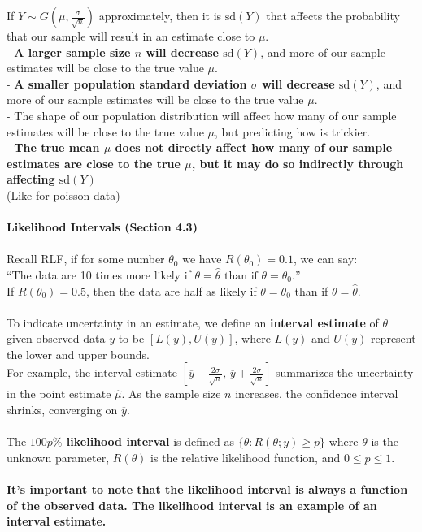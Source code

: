 \documentclass[a4paper,12pt]{article}
\begin{document}
\newpage
If $Y \sim G \left(\mu, \frac{\sigma}{\sqrt{n}} \right)$ approximately, then it is $\text{sd}(Y)$ that affects the probability that our sample will result in an estimate close to $\mu$.
\\- \textbf{A larger sample size $n$ will decrease $\text{sd}(Y)$}, and more of our sample estimates will be close to the true value $\mu$.
\\- \textbf{A smaller population standard deviation $\sigma$ will decrease $\text{sd}(Y)$}, and more of our sample estimates will be close to the true value $\mu$.
\\- The shape of our population distribution will affect how many of our sample estimates will be close to the true value $\mu$, but predicting how is trickier.
\\- \textbf{The true mean $\mu$ does not directly affect how many of our sample estimates are close to the true $\mu$, but it may do so indirectly through affecting $\text{sd}(Y)$ } \\(Like for poisson data)
\\
\\\textbf{Likelihood Intervals (Section 4.3)}
\\
\\Recall RLF, if for some number $\theta_0$ we have $R(\theta_0) = 0.1$, we can say:
\\“The data are 10 times more likely if $ \theta = \hat{\theta} \text{ than if } \theta = \theta_0.”$
\\If $R(\theta_0) = 0.5$, then the data are half as likely if $\theta = \theta_0$ than if $\theta = \hat{\theta}$.
\\
\\To indicate uncertainty in an estimate, we define an \textbf{interval estimate} of $\theta$ given observed data $y$ to be 
$[L(y), U(y)]$, where $L(y)$ and $U(y)$ represent the lower and upper bounds.
\\ For example, the interval estimate $
\left[\overline{y} - \frac{2\sigma}{\sqrt{n}}, \, \overline{y} + \frac{2\sigma}{\sqrt{n}} \right]
$
summarizes the uncertainty in the point estimate $\hat{\mu}$. As the sample size $n$ increases, the confidence interval shrinks, converging on $\overline{y}$.
\\
\\The \textbf{$100p\%$ likelihood interval} is defined as $\{ \theta : R(\theta; y) \geq p \}$
where $\theta$ is the unknown parameter, $R(\theta)$ is the relative likelihood function, and $0 \leq p \leq 1$. 
\\
\\ \textbf{It's important to note that the likelihood interval is always a function of the observed data. The likelihood interval is an example of an interval estimate.}
\end{document}
